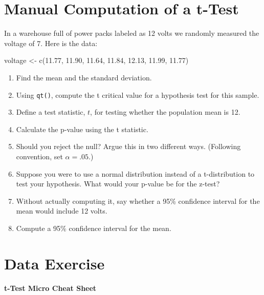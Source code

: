 \documentclass[
]{book}
\newenvironment{Shaded}{\begin{snugshade}}{\end{snugshade}}
\newcommand{\FloatTok}[1]{\textcolor[rgb]{0.00,0.00,0.81}{#1}}
\newcommand{\FunctionTok}[1]{\textcolor[rgb]{0.00,0.00,0.00}{#1}}
\newcommand{\NormalTok}[1]{#1}
\newcommand{\OtherTok}[1]{\textcolor[rgb]{0.56,0.35,0.01}{#1}}
\theoremstyle{definition}
\theoremstyle{definition}
\theoremstyle{definition}
\theoremstyle{definition}
\theoremstyle{remark}
\begin{document}
\hypertarget{manual-computation-of-a-t-test}{%
\section{Manual Computation of a t-Test}\label{manual-computation-of-a-t-test}}

In a warehouse full of power packs labeled as 12 volts we randomly measured the voltage of 7. Here is the data:

\begin{Shaded}
\begin{Highlighting}[]
\NormalTok{voltage }\OtherTok{\textless{}{-}} \FunctionTok{c}\NormalTok{(}\FloatTok{11.77}\NormalTok{, }\FloatTok{11.90}\NormalTok{, }\FloatTok{11.64}\NormalTok{, }\FloatTok{11.84}\NormalTok{, }\FloatTok{12.13}\NormalTok{, }\FloatTok{11.99}\NormalTok{,  }\FloatTok{11.77}\NormalTok{)}
\end{Highlighting}
\end{Shaded}

\begin{enumerate}
\def\labelenumi{\arabic{enumi}.}
\item
  Find the mean and the standard deviation.
\item
  Using \texttt{qt()}, compute the t critical value for a hypothesis test for this sample.
\item
  Define a test statistic, \(t\), for testing whether the population mean is 12.
\item
  Calculate the p-value using the t statistic.
\item
  Should you reject the null? Argue this in two different ways. (Following convention, set \(\alpha = .05\).)
\item
  Suppose you were to use a normal distribution instead of a t-distribution to test your hypothesis. What would your p-value be for the z-test?
\item
  Without actually computing it, say whether a 95\% confidence interval for the mean would include 12 volts.
\item
  Compute a 95\% confidence interval for the mean.
\end{enumerate}

\hypertarget{data-exercise}{%
\section{Data Exercise}\label{data-exercise}}

\textbf{t-Test Micro Cheat Sheet}
\end{document}
